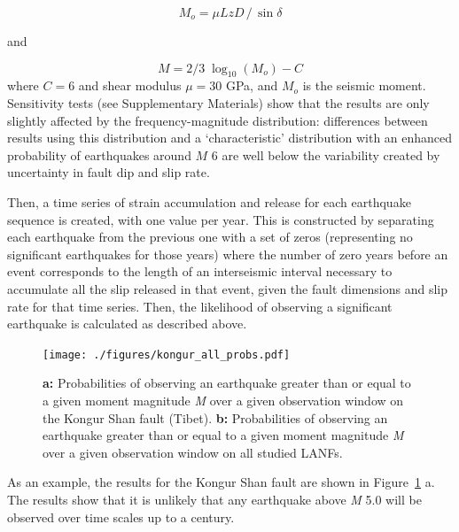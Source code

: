 \documentclass[twocolumn,grl]{AGUTeX}
\begin{document}
\begin{article}
\begin{equation}
 M_o = \mu L z D \,/ \, \sin \delta 
 \end{equation}

and

\begin{equation}
M = 2/3 \; \log_{10} (M_o) - C 
\end{equation}
where $C = 6 $ and shear modulus $\mu = 30$ GPa, and $M_o$ is the seismic moment.  Sensitivity tests (see Supplementary Materials) show that the results are only slightly affected by the frequency-magnitude distribution: differences between results using this distribution and a `characteristic' distribution with an enhanced probability of earthquakes around $M$ 6 are well below the variability created by uncertainty in fault dip and slip rate.  

Then, a time series of strain accumulation and release for each earthquake sequence is created, with one value per year.  This is constructed by separating each earthquake from the previous one with a set of zeros (representing no significant earthquakes for those years) where the number of zero years before an event corresponds to the length of an interseismic interval necessary to accumulate all the slip released in that event, given the fault dimensions and slip rate for that time series. Then, the likelihood of observing a significant earthquake is calculated as described above.

\begin{figure}[ht!]
\noindent\texttt{[image: ./figures/kongur\_all\_probs.pdf]}
\caption{\textbf{a:} Probabilities of observing an earthquake greater than or equal to a given moment magnitude \emph{M} over a given observation window on the Kongur Shan fault (Tibet). \textbf{b:} Probabilities of observing an earthquake greater than or equal to a given moment magnitude \emph{M} over a given observation window on all studied LANFs. }
\label{fig:kongur_all_probs}
\end{figure}

As an example, the results for the Kongur Shan fault are shown in Figure~\ref{fig:kongur_all_probs} a.  The results show that it is unlikely that any earthquake above \emph{M} 5.0 will be observed over time scales up to a century. 



\end{article}
\end{document}
